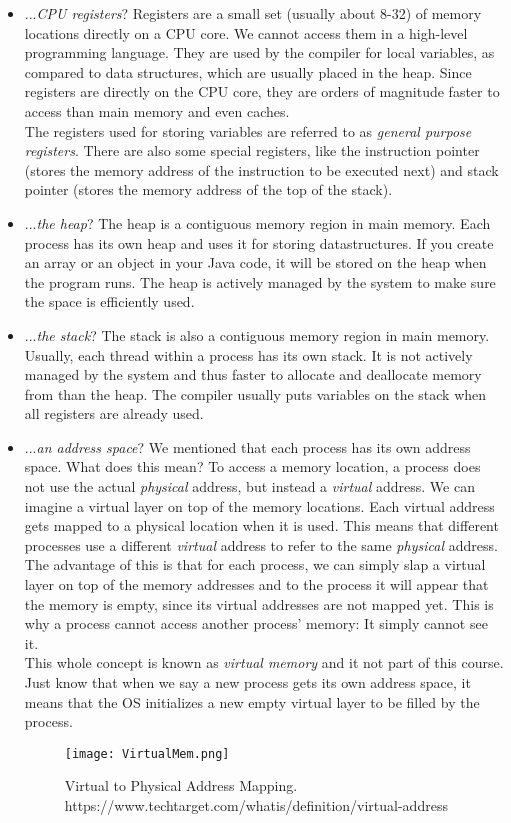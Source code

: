 \documentclass[main]{subfiles}
\begin{document}
\begin{itemize}
  \item ...\textit{CPU registers}? Registers are a small set (usually about 8-32) of memory locations directly on a CPU core. We cannot access them in a high-level programming language. They are used by the compiler for local variables, as compared to data structures, which are usually placed in the heap. Since registers are directly on the CPU core, they are orders of magnitude faster to access than main memory and even caches.\\
  The registers used for storing variables are referred to as \textit{general purpose registers}. There are also some special registers, like the instruction pointer (stores the memory address of the instruction to be executed next) and stack pointer (stores the memory address of the top of the stack).
  \item ...\textit{the heap}? The heap is a contiguous memory region in main memory. Each process has its own heap and uses it for storing datastructures. If you create an array or an object in your Java code, it will be stored on the heap when the program runs. The heap is actively managed by the system to make sure the space is efficiently used.
  \item ...\textit{the stack}? The stack is also a contiguous memory region in main memory. Usually, each thread within a process has its own stack. It is not actively managed by the system and thus faster to allocate and deallocate memory from than the heap. The compiler usually puts variables on the stack when all registers are already used.
  \item ...\textit{an address space}? We mentioned that each process has its own address space. What does this mean? To access a memory location, a process does not use the actual \textit{physical} address, but instead a \textit{virtual} address. We can imagine a virtual layer on top of the memory locations. Each virtual address gets mapped to a physical location when it is used. This means that different processes use a different \textit{virtual} address to refer to the same \textit{physical} address. The advantage of this is that for each process, we can simply slap a virtual layer on top of the memory addresses and to the process it will appear that the memory is empty, since its virtual addresses are not mapped yet. This is why a process cannot access another process' memory: It simply cannot see it.\\
  This whole concept is known as \textit{virtual memory} and it not part of this course. Just know that when we say a new process gets its own address space, it means that the OS initializes a new empty virtual layer to be filled by the process.
    \begin{figure}[H]
        \centering
        \texttt{[image: VirtualMem.png]}
        \caption{Virtual to Physical Address Mapping. https://www.techtarget.com/whatis/definition/virtual-address}
    \end{figure}

\end{itemize}
\end{document}

